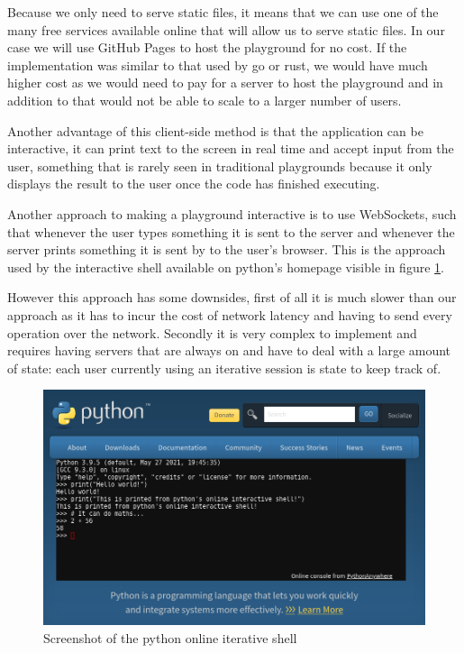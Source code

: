\documentclass{article}
\begin{document}
Because we only need to serve static files, it means that we can use one of the
many free services available online that will allow us to serve static files.
In our case we will use GitHub Pages to host the playground for no cost. If the
implementation was similar to that used by go or rust, we would have much
higher cost as we would need to pay for a server to host the playground and in
addition to that would not be able to scale to a larger number of users.

Another advantage of this client-side method is that the application can be
interactive, it can print text to the screen in real time and accept input from
the user, something that is rarely seen in traditional playgrounds because it
only displays the result to the user once the code has finished executing.

Another approach to making a playground interactive is to use WebSockets, such
that whenever the user types something it is sent to the server and whenever
the server prints something it is sent by to the user's browser. This is the
approach used by the interactive shell available on python's homepage visible
in figure \ref{fig:python-playground}.

However this approach has some downsides, first of all it is much slower than
our approach as it has to incur the cost of network latency and having to send
every operation over the network. Secondly it is very complex to implement and
requires having servers that are always on and have to deal with a large amount
of state: each user currently using an iterative session is state to keep
track of.

\begin{figure}
	\includegraphics[width=\textwidth]{python-playground}
	\caption{Screenshot of the python online iterative shell}
	\label{fig:python-playground}
\end{figure}
\end{document}
